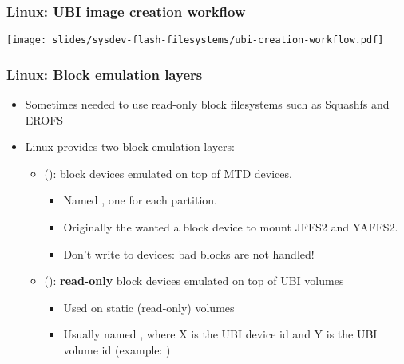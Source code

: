 \begin{frame}
  \frametitle{Linux: UBI image creation workflow}
  \begin{center}
    \texttt{[image: slides/sysdev-flash-filesystems/ubi-creation-workflow.pdf]}
  \end{center}
\end{frame}

\begin{frame}
  \frametitle{Linux: Block emulation layers}
  \begin{itemize}
  \item Sometimes needed to use read-only block filesystems such as Squashfs and EROFS
  \item Linux provides two block emulation layers:
    \begin{itemize}
    \item {} ():
       block devices emulated on top of MTD devices.
       \begin{itemize}
       \item Named , one for each partition.
       \item Originally the  wanted a block device to mount JFFS2 and YAFFS2.
       \item Don't write to  devices: bad blocks are not handled!
       \end{itemize}
    \item {} ():
       {\bf read-only} block devices emulated on top of UBI volumes
       \begin{itemize}
       \item Used on static (read-only) volumes
       \item Usually named , where X is the UBI device
             id and Y is the UBI volume id (example: )
       \end{itemize}
    \end{itemize}
  \end{itemize}
\end{frame}
